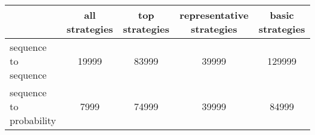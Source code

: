 \begin{tabular}{lcccc}
\toprule
{} &  all strategies &  top strategies &  representative strategies &  basic strategies \\
\midrule
sequence to sequence    &           19999 &           83999 &                    39999 &            129999 \\
sequence to probability &            7999 &           74999 &                    39999 &             84999 \\
\bottomrule
\end{tabular}
